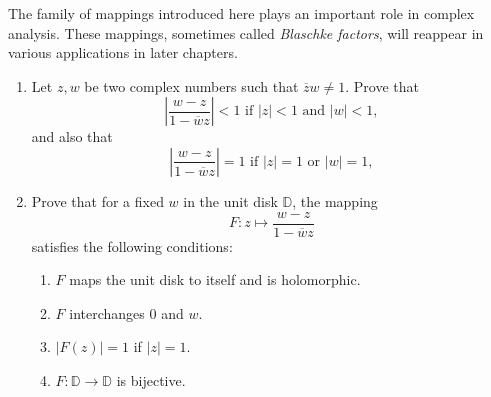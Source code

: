 \documentclass[12 pt, letterpaper]{hmcpset}
\begin{document}
\pagebreak

\begin{problem}[7]
	The family of mappings introduced here plays an important role in complex analysis. These mappings, sometimes called \emph{Blaschke factors}, will reappear in various applications in later chapters.
	\begin{enumerate}
		\item Let $z, w$ be two complex numbers such that $\overline{z} w \neq 1$. Prove that
			\[
				\left \lvert \frac{w - z}{1 - \overline{w} z} \right \rvert < 1 \text{ if } \lvert z \rvert < 1 \text{ and } \lvert w \rvert < 1,
			\]
			and also that
			\[
					\left \lvert \frac{w - z}{1 - \overline{w} z} \right \rvert = 1 \text{ if } \lvert z \rvert = 1 \text{ or } \lvert w \rvert = 1,
			\]
		\item Prove that for a fixed $w$ in the unit disk $\mathbb{D}$, the mapping
			\[
				F : z \mapsto \frac{w - z}{1 - \overline{w} z}
			\]
			satisfies the following conditions:
			\begin{enumerate}[label = (\roman*)]
				\item $F$ maps the unit disk to itself and is holomorphic.
				\item $F$ interchanges $0$ and $w$.
				\item $\lvert F(z) \rvert = 1$ if $\lvert z \rvert = 1$.
				\item $F : \mathbb{D} \to \mathbb{D}$ is bijective.
			\end{enumerate}
	\end{enumerate}
\end{problem}
\end{document}
